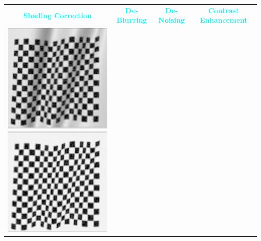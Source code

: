 \documentclass{book}
\begin{document}
\begin{center}
    \begin{tabular}{|c|c|c|c|}
        \hline
        \textcolor{cyan}{\textbf{Shading Correction}} & \textcolor{cyan}{\textbf{De-Blurring}} & \textcolor{cyan}{\textbf{De-Noising}} & \textcolor{cyan}{\textbf{Contrast Enhancement}} \\
        \includegraphics[scale=0.25]{chapter 8/ch8_figure1.jpeg} & 

\end{tabular}
\end{center}
\end{document}
